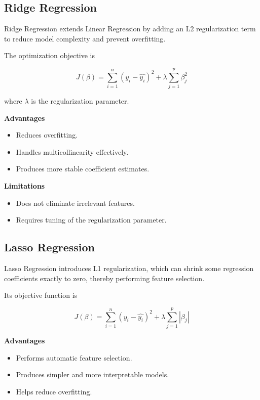 \documentclass{article}
\begin{document}
\subsection{Ridge Regression}

Ridge Regression extends Linear Regression by adding an L2 regularization term to reduce model complexity and prevent overfitting.

The optimization objective is

\[
J(\beta)=
\sum_{i=1}^{n}(y_i-\hat{y_i})^2
+
\lambda
\sum_{j=1}^{p}\beta_j^2
\]

where $\lambda$ is the regularization parameter.

\textbf{Advantages}

\begin{itemize}
\item Reduces overfitting.
\item Handles multicollinearity effectively.
\item Produces more stable coefficient estimates.
\end{itemize}

\textbf{Limitations}

\begin{itemize}
\item Does not eliminate irrelevant features.
\item Requires tuning of the regularization parameter.
\end{itemize}


\subsection{Lasso Regression}

Lasso Regression introduces L1 regularization, which can shrink some regression coefficients exactly to zero, thereby performing feature selection.

Its objective function is

\[
J(\beta)=
\sum_{i=1}^{n}(y_i-\hat{y_i})^2
+
\lambda
\sum_{j=1}^{p}|\beta_j|
\]

\textbf{Advantages}

\begin{itemize}
\item Performs automatic feature selection.
\item Produces simpler and more interpretable models.
\item Helps reduce overfitting.
\end{itemize}
\end{document}
